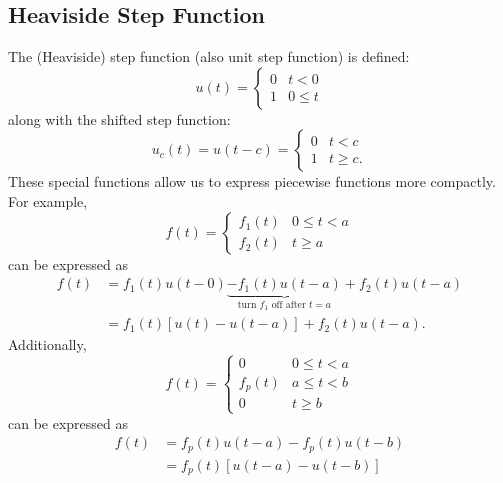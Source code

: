 \documentclass{article}
\begin{document}
\subsection{Heaviside Step Function}
The (Heaviside) step function (also unit step function) is defined:
\begin{equation*}
    u\left( t \right) = \begin{cases}
        0 & t < 0    \\
        1 & 0 \leq t
    \end{cases}
\end{equation*}
along with the shifted step function:
\begin{equation*}
    u_c\left( t \right) = u\left( t - c \right) = \begin{cases}
        0 & t < c     \\
        1 & t \geq c.
    \end{cases}
\end{equation*}
These special functions allow us to express piecewise functions more compactly. For example,
\begin{equation*}
    f\left( t \right) = \begin{cases}
        f_1\left( t \right) & 0 \leq t < a \\
        f_2\left( t \right) & t \geq a
    \end{cases}
\end{equation*}
can be expressed as
\begin{align*}
    f\left( t \right) & = f_1\left( t \right) u\left( t - 0 \right) \underbrace{- f_1\left( t \right) u\left( t - a \right)}_{\text{turn \(f_1\) off after \(t = a\)}} + f_2\left( t \right) u\left( t - a \right) \\
                      & = f_1\left( t \right) \left[ u\left( t \right) - u\left( t - a \right) \right] + f_2\left( t \right) u\left( t - a \right).
\end{align*}
Additionally,
\begin{equation*}
    f\left( t \right) = \begin{cases}
        0                   & 0 \leq t < a \\
        f_p\left( t \right) & a \leq t < b \\
        0                   & t \geq b
    \end{cases}
\end{equation*}
can be expressed as
\begin{align*}
    f\left( t \right) & = f_p\left( t \right) u\left( t - a \right) - f_p\left( t \right) u\left( t - b \right) \\
                      & = f_p\left( t \right) \left[ u\left( t - a \right) - u\left( t - b \right) \right]
\end{align*}
\end{document}
